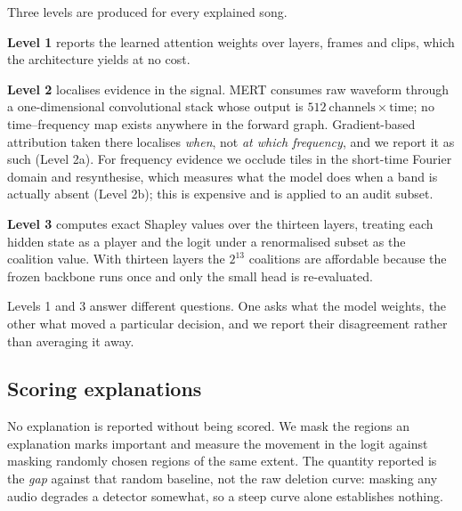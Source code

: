 Three levels are produced for every explained song.

\textbf{Level 1} reports the learned attention weights over layers, frames and
clips, which the architecture yields at no cost.

\textbf{Level 2} localises evidence in the signal. MERT consumes raw waveform
through a one-dimensional convolutional stack whose output is
$512~\text{channels} \times \text{time}$; no time--frequency map exists anywhere
in the forward graph. Gradient-based attribution taken there localises
\emph{when}, not \emph{at which frequency}, and we report it as such (Level 2a).
For frequency evidence we occlude tiles in the short-time Fourier domain and
resynthesise, which measures what the model does when a band is actually absent
(Level 2b); this is expensive and is applied to an audit subset.

\textbf{Level 3} computes exact Shapley values over the thirteen layers, treating
each hidden state as a player and the logit under a renormalised subset as the
coalition value. With thirteen layers the $2^{13}$ coalitions are affordable
because the frozen backbone runs once and only the small head is re-evaluated.

Levels 1 and 3 answer different questions. One asks what the model weights, the
other what moved a particular decision, and we report their disagreement rather than
averaging it away.

\subsection{Scoring explanations}

No explanation is reported without being scored. We mask the regions an
explanation marks important and measure the movement in the logit against
masking randomly chosen regions of the same extent. The quantity reported is the
\emph{gap} against that random baseline, not the raw deletion curve: masking any
audio degrades a detector somewhat, so a steep curve alone establishes nothing.
